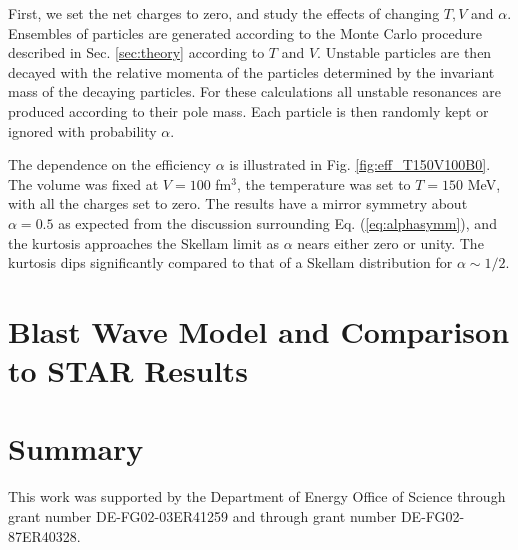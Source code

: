 \documentclass[aps,prc,nofootinbib,showpacs,superscriptaddress,groupedaddress]{revtex4-1}
\begin{document}
First, we set the net charges to zero, and study the effects of changing $T,V$ and $\alpha$. Ensembles of particles are generated according to the Monte Carlo procedure described in Sec. \ref{sec:theory} according to $T$ and $V$. Unstable particles are then decayed with the relative momenta of the particles determined by the invariant mass of the decaying particles. For these calculations all unstable resonances are produced according to their pole mass. Each particle is then randomly kept or ignored with probability $\alpha$. 

The dependence on the efficiency $\alpha$ is illustrated in Fig. \ref{fig:eff_T150V100B0}. The volume was fixed at $V=100$ fm$^3$, the temperature was set to $T=150$ MeV, with all the charges set to zero. The results have a mirror symmetry about $\alpha=0.5$ as expected from the discussion surrounding Eq. (\ref{eq:alphasymm}), and the kurtosis approaches the Skellam limit as $\alpha$ nears either zero or unity. The kurtosis dips significantly compared to that of a Skellam distribution for $\alpha\sim 1/2$. 




\section{Blast Wave Model and Comparison to STAR Results}\label{sec:blast}

\section{Summary}\label{sec:summary}

\begin{acknowledgments}
This work was supported by the Department of Energy Office of Science through grant number DE-FG02-03ER41259 and through grant number DE-FG02-87ER40328. 
\end{acknowledgments}
\end{document}
